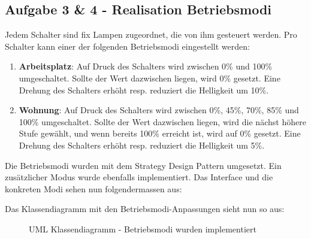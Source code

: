 \documentclass[11pt,ngerman]{article}
\begin{document}
     \subsection{Aufgabe 3  \& 4 - Realisation Betriebsmodi}
     Jedem Schalter sind fix Lampen zugeordnet, die von ihm gesteuert werden. Pro Schalter kann einer der folgenden Betriebsmodi eingestellt werden:
     \begin{enumerate}
        \item \textbf{Arbeitsplatz}: Auf Druck des Schalters wird zwischen 0\% und 100\% umgeschaltet. Sollte der Wert dazwischen liegen, wird 0\% gesetzt. Eine Drehung des Schalters erhöht resp. reduziert die Helligkeit um 10\%.
        \item \textbf{Wohnung}: Auf Druck des Schalters wird zwischen 0\%, 45\%, 70\%, 85\% und 100\% umgeschaltet. Sollte der Wert dazwischen liegen, wird die nächst höhere Stufe gewählt, und wenn bereits 100\% erreicht ist, wird auf 0\% gesetzt. Eine Drehung des Schalters erhöht resp. reduziert die Helligkeit um 5\%.
    \end{enumerate}

    \noindent Die Betriebsmodi wurden mit dem Strategy Design Pattern  umgesetzt. Ein zusätzlicher Modus wurde ebenfalls implementiert.  Das Interface und die konkreten Modi sehen nun folgendermassen aus:
    
    \vspace{.5cm}
    
    \vspace{.5cm}
    
    \vspace{.5cm}
    
    \vspace{.5cm}

    Das Klassendiagramm mit den Betriebsmodi-Anpassungen sieht nun so aus:
    \begin{figure}[H]
        \centering
        \caption{UML Klassendiagramm  -  Betriebsmodi wurden implementiert}
        \label{fig:ClassDiagram_Aufg3}
    \end{figure}
\end{document}
